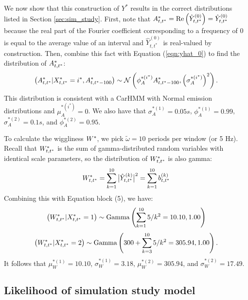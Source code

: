 %

We now show that this construction of $Y^*$ results in the correct distributions listed in Section \ref{sec:sim_study}. First, note that $A^*_{t,t^*} = \text{Re}\left(\hat{Y}^{(0)}_{t,t^*}\right) = \hat{Y}^{(0)}_{t,t^*}$ because the real part of the Fourier coefficient corresponding to a frequency of 0 is equal to the average value of an interval and $\hat{Y}^{(0)}_{t,t^*}$ is real-valued by construction. Then, combine this fact with Equation (\ref{eqn:yhat_0}) to find the distribution of $A^*_{t,t^*}$: 
%
$$\left(A^*_{t,t^*} | X^*_{t,t^*} = i^*, A^*_{t,t^*-100} \right) \sim \mathcal{N} \left(\phi_A^{*(i^*)} A^*_{t,t^*-100}, \left(\sigma_A^{*(i^*)}\right)^2 \right).$$
%
This distribution is consistent with a CarHMM with Normal emission distributions and $\mu_A^{*(i^*)} = 0$. We also have that $\sigma_A^{*(1)} = 0.05s$, $\phi_A^{*(1)} = 0.99$, $\sigma_A^{*(2)} = 0.1s$, and $\phi_A^{*(2)} = 0.95$.

To calculate the wiggliness $W^*$, we pick $\tilde{\omega} = 10$ periods per window (or 5 Hz). Recall that $W^*_{t,t^*}$ is the sum of gamma-distributed random variables with identical scale parameters, so the distribution of $W^*_{t,t^*}$ is also gamma:
%
$$W^*_{t,t^*} = \sum_{k=1}^{10} \big|\hat{Y}^{(k)}_{t,t^*}\big|^2 = \sum_{k=1}^{10} b^{(k)}_{t,t^*}$$
Combining this with Equation block (5), we have:
%
$$\left(W^*_{t,t^*}|X^*_{t,t^*} = 1\right) \sim {\rm{Gamma}}\left(\sum_{k=1}^{10} 5/k^2 = 10.10, 1.00 \right)$$
%
$$\left(W^*_{t,t^*}|X^*_{t,t^*} = 2\right) \sim {\rm{Gamma}}\left(300 + \sum_{k=3}^{10} 5/k^2 = 305.94 , 1.00 \right).$$
%
It follows that $\mu_W^{*(1)} = 10.10$, $\sigma_W^{*(1)} = 3.18$, $\mu_W^{*(2)} = 305.94$, and $\sigma_W^{*(2)} = 17.49$.

\subsection{Likelihood of simulation study model}

